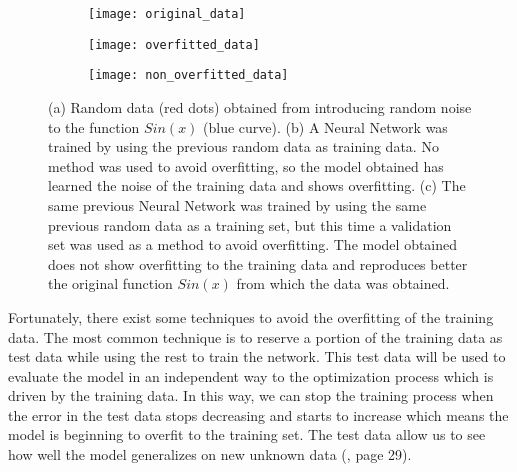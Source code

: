 \begin{figure}
	\centering
	\begin{subfigure}[b]{0.6\textwidth}
		\centering
		\texttt{[image: original\_data]}
		\caption{}
		\label{fig:original_data}
	\end{subfigure}
	\hspace{0.001mm}
	\begin{subfigure}[b]{0.6\textwidth}
		\centering
		\texttt{[image: overfitted\_data]}
		\caption{}
		\label{fig:overfitted_data}
	\end{subfigure}
	\hspace{0.001mm}
	\begin{subfigure}[b]{0.6\textwidth}
		\centering
		\texttt{[image: non\_overfitted\_data]}
		\caption{}
		\label{fig:non_overfitted_data}
	\end{subfigure}
	\caption[Overfitting of a Neural Network.]{(a) Random data (red dots) obtained from introducing random noise to the function $Sin(x)$ (blue curve). (b) A Neural Network was trained by using the previous random data as training data. No method was used to avoid overfitting, so the model obtained has learned the noise of the training data and shows overfitting. (c) The same previous Neural Network was trained by using the same previous random data as a training set, but this time a validation set was used as a method to avoid overfitting. The model obtained does not show overfitting to the training data and reproduces better the original function $Sin(x)$ from which the data was obtained.}
	\label{fig:overfitting}
\end{figure}

Fortunately, there exist some techniques to avoid the overfitting of the training data. The most common technique is to reserve a portion of the training data as test data while using the rest to train the network. This test data will be used to evaluate the model in an independent way to the optimization process which is driven by the training data. In this way, we can stop the training process when the error in the test data stops decreasing and starts to increase which means the model is beginning to overfit to the training set. The test data allow us to see how well the model generalizes on new unknown data (\cite{fudamentals_deep_learning}, page 29).\\

